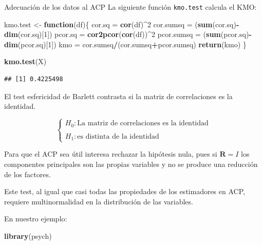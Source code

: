 \documentclass[
  ignorenonframetext,
]{beamer}
\newenvironment{Shaded}{\begin{snugshade}}{\end{snugshade}}
\newcommand{\ControlFlowTok}[1]{\textcolor[rgb]{0.13,0.29,0.53}{\textbf{#1}}}
\newcommand{\DecValTok}[1]{\textcolor[rgb]{0.00,0.00,0.81}{#1}}
\newcommand{\FunctionTok}[1]{\textcolor[rgb]{0.13,0.29,0.53}{\textbf{#1}}}
\newcommand{\NormalTok}[1]{#1}
\newcommand{\OtherTok}[1]{\textcolor[rgb]{0.56,0.35,0.01}{#1}}
\newcommand{\SpecialCharTok}[1]{\textcolor[rgb]{0.81,0.36,0.00}{\textbf{#1}}}
\begin{document}
\begin{frame}[fragile]{Adecuación de los datos al ACP}
\label{adecuaciuxf3n-de-los-datos-al-acp-3}
La siguiente función \texttt{kmo.test} calcula el KMO:

\begin{Shaded}
\begin{Highlighting}[]
\NormalTok{kmo.test }\OtherTok{\textless{}{-}} \ControlFlowTok{function}\NormalTok{(df)\{}
\NormalTok{cor.sq }\OtherTok{=} \FunctionTok{cor}\NormalTok{(df)}\SpecialCharTok{\^{}}\DecValTok{2}
\NormalTok{cor.sumsq }\OtherTok{=}\NormalTok{ (}\FunctionTok{sum}\NormalTok{(cor.sq)}\SpecialCharTok{{-}}\FunctionTok{dim}\NormalTok{(cor.sq)[}\DecValTok{1}\NormalTok{])}
\NormalTok{pcor.sq }\OtherTok{=} \FunctionTok{cor2pcor}\NormalTok{(}\FunctionTok{cor}\NormalTok{(df))}\SpecialCharTok{\^{}}\DecValTok{2}
\NormalTok{pcor.sumsq }\OtherTok{=}\NormalTok{ (}\FunctionTok{sum}\NormalTok{(pcor.sq)}\SpecialCharTok{{-}}\FunctionTok{dim}\NormalTok{(pcor.sq)[}\DecValTok{1}\NormalTok{])}
\NormalTok{kmo }\OtherTok{=}\NormalTok{ cor.sumsq}\SpecialCharTok{/}\NormalTok{(cor.sumsq}\SpecialCharTok{+}\NormalTok{pcor.sumsq)}
\FunctionTok{return}\NormalTok{(kmo)}
\NormalTok{\} }

\FunctionTok{kmo.test}\NormalTok{(X)}
\end{Highlighting}
\end{Shaded}

\begin{verbatim}
## [1] 0.4225498
\end{verbatim}

El test esfericidad de Barlett contrasta si la matriz de correlaciones
es la identidad.

\[\left\{ \begin{array}{l}
H_0: \mbox{La matriz de correlaciones es la identidad}\\\\ H_1: \mbox{es
distinta de la
identidad}\end{array}\right.\]

Para que el ACP sea útil interesa rechazar la hipótesis nula, pues si
\(\mathbf{R}=I\) los componentes principales son las propias variables y
no se produce una reducción de los factores.

Este test, al igual que casi todas las propiedades de los estimadores en
ACP, requiere multinormalidad en la distribución de las variables.

En nuestro ejemplo:

\begin{Shaded}
\begin{Highlighting}[]
\FunctionTok{library}\NormalTok{(psych)}
\end{Highlighting}
\end{Shaded}


\end{frame}
\end{document}
